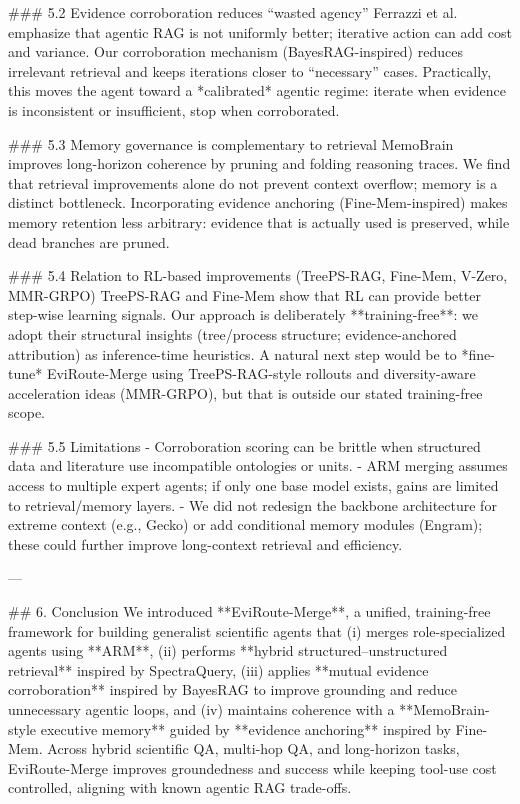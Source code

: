 ### 5.2 Evidence corroboration reduces “wasted agency”  
Ferrazzi et al. emphasize that agentic RAG is not uniformly better; iterative action can add cost and variance. Our corroboration mechanism (BayesRAG-inspired) reduces irrelevant retrieval and keeps iterations closer to “necessary” cases. Practically, this moves the agent toward a *calibrated* agentic regime: iterate when evidence is inconsistent or insufficient, stop when corroborated.

### 5.3 Memory governance is complementary to retrieval  
MemoBrain improves long-horizon coherence by pruning and folding reasoning traces. We find that retrieval improvements alone do not prevent context overflow; memory is a distinct bottleneck. Incorporating evidence anchoring (Fine-Mem-inspired) makes memory retention less arbitrary: evidence that is actually used is preserved, while dead branches are pruned.

### 5.4 Relation to RL-based improvements (TreePS-RAG, Fine-Mem, V-Zero, MMR-GRPO)  
TreePS-RAG and Fine-Mem show that RL can provide better step-wise learning signals. Our approach is deliberately **training-free**: we adopt their structural insights (tree/process structure; evidence-anchored attribution) as inference-time heuristics. A natural next step would be to *fine-tune* EviRoute-Merge using TreePS-RAG-style rollouts and diversity-aware acceleration ideas (MMR-GRPO), but that is outside our stated training-free scope.

### 5.5 Limitations  
- Corroboration scoring can be brittle when structured data and literature use incompatible ontologies or units.  
- ARM merging assumes access to multiple expert agents; if only one base model exists, gains are limited to retrieval/memory layers.  
- We did not redesign the backbone architecture for extreme context (e.g., Gecko) or add conditional memory modules (Engram); these could further improve long-context retrieval and efficiency.

---

## 6. Conclusion  
We introduced **EviRoute-Merge**, a unified, training-free framework for building generalist scientific agents that (i) merges role-specialized agents using **ARM**, (ii) performs **hybrid structured–unstructured retrieval** inspired by SpectraQuery, (iii) applies **mutual evidence corroboration** inspired by BayesRAG to improve grounding and reduce unnecessary agentic loops, and (iv) maintains coherence with a **MemoBrain-style executive memory** guided by **evidence anchoring** inspired by Fine-Mem. Across hybrid scientific QA, multi-hop QA, and long-horizon tasks, EviRoute-Merge improves groundedness and success while keeping tool-use cost controlled, aligning with known agentic RAG trade-offs.

